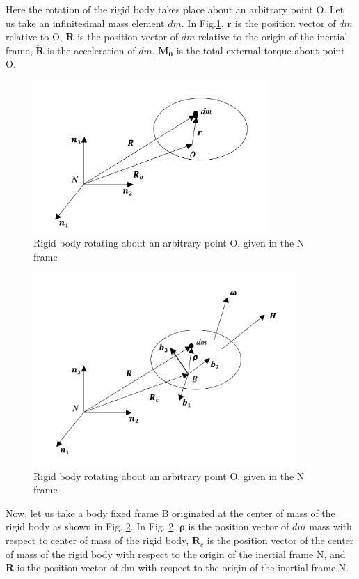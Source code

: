 Here the rotation of the rigid body takes place about an arbitrary point O. 
Let us take an infinitesimal mass element $dm$. 
In Fig.\ref{fig:attDyn1}, $\bm{r}$ is the position vector of $dm$ relative to O, $\bm{R}$ is the position vector of $dm$ relative to the origin of the inertial frame, $\ddot{\bm{R}}$ is the acceleration of $dm$, $\bm{M_0}$ is the total external torque about point O.

\begin{figure}
\begin{center}
\includegraphics[width=9cm]{figures/attDyn1}    %
\caption{Rigid body rotating about an arbitrary point O, given in the N frame} 
\label{fig:attDyn1}
\end{center}
\end{figure}

\begin{figure}
\begin{center}
\includegraphics[width=10cm]{figures/attDyn2}    %
\caption{Rigid body rotating about an arbitrary point O, given in the N frame} 
\label{fig:attDyn2}
\end{center}
\end{figure}

Now, let us take a body fixed frame B originated at the center of mass of the rigid body as shown in Fig. \ref{fig:attDyn2}. 
In Fig. \ref{fig:attDyn2}, $\bm{\rho}$  is the position vector of $dm$ mass with respect to center of mass of the rigid body, $\bm{R}_c$ is the position vector of the center of mass of the rigid body with respect to the origin of the inertial frame N, and $\bm{R}$ is the position vector of dm with respect to the origin of the inertial frame N. 

